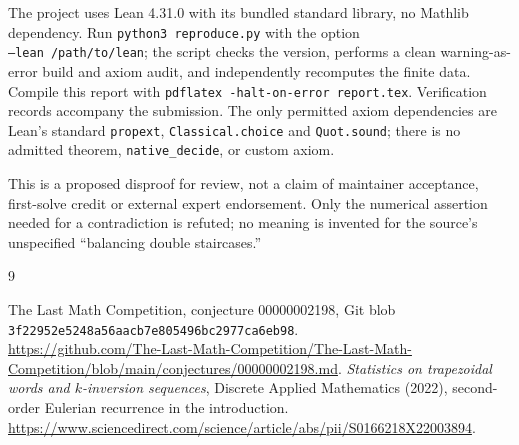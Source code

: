 \documentclass[11pt]{article}
\begin{document}
The project uses Lean 4.31.0 with its bundled standard library, no Mathlib dependency. Run \texttt{python3 reproduce.py} with the option\\
\texttt{--lean /path/to/lean}; the script checks the version, performs a clean warning-as-error build and axiom audit, and independently recomputes the finite data. Compile this report with \texttt{pdflatex -halt-on-error report.tex}. Verification records accompany the submission. The only permitted axiom dependencies are Lean's standard \texttt{propext}, \texttt{Classical.choice} and \texttt{Quot.sound}; there is no admitted theorem, \texttt{native\_decide}, or custom axiom.

This is a proposed disproof for review, not a claim of maintainer acceptance, first-solve credit or external expert endorsement. Only the numerical assertion needed for a contradiction is refuted; no meaning is invented for the source's unspecified ``balancing double staircases.''

\begin{thebibliography}{9}
\raggedright
{} The Last Math Competition, conjecture 00000002198, Git blob
\texttt{3f22952e5248a56aacb7e805496bc2977ca6eb98}.\\
\url{https://github.com/The-Last-Math-Competition/The-Last-Math-Competition/blob/main/conjectures/00000002198.md}.
 \emph{Statistics on trapezoidal words and $k$-inversion sequences}, Discrete Applied Mathematics (2022), second-order Eulerian recurrence in the introduction.\\
\url{https://www.sciencedirect.com/science/article/abs/pii/S0166218X22003894}.
\end{thebibliography}
\end{document}

